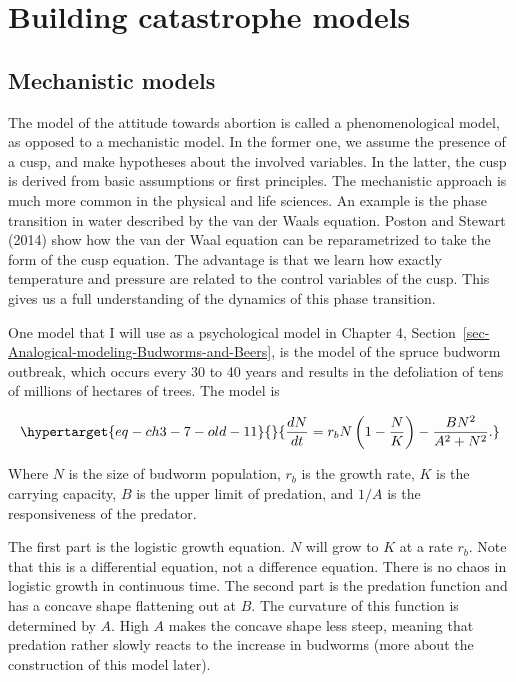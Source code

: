 \documentclass[
  a4paper,
  DIV=11,
  numbers=noendperiod,
  oneside]{scrreprt}
\begin{document}
\hypertarget{sec-Building-catastrophe-models}{%
\section{Building catastrophe
models}\label{sec-Building-catastrophe-models}}

\hypertarget{sec-Mechanistic-models}{%
\subsection{Mechanistic models}\label{sec-Mechanistic-models}}

The model of the attitude towards abortion is called a phenomenological
model, as opposed to a mechanistic model. In the former one, we assume
the presence of a cusp, and make hypotheses about the involved
variables. In the latter, the cusp is derived from basic assumptions or
first principles. The mechanistic approach is much more common in the
physical and life sciences. An example is the phase transition in water
described by the van der Waals equation. Poston and Stewart (2014) show
how the van der Waal equation can be reparametrized to take the form of
the cusp equation. The advantage is that we learn how exactly
temperature and pressure are related to the control variables of the
cusp. This gives us a full understanding of the dynamics of this phase
transition.

One model that I will use as a psychological model in Chapter 4,
Section~\ref{sec-Analogical-modeling-Budworms-and-Beers}, is the model
of the spruce budworm outbreak, which occurs every 30 to 40 years and
results in the defoliation of tens of millions of hectares of trees. The
model is

\begin{equation}\protect\hypertarget{eq-ch3-7-old-11}{}{
\frac{dN}{dt} = r_{b}N\left( 1 - \frac{N}{K} \right) - \frac{BN^{2}}{A^{2} + N^{2}}.
}\label{eq-ch3-7-old-11}\end{equation}

Where \(N\) is the size of budworm population, \(r_{b}\) is the growth
rate, \(K\) is the carrying capacity, \(B\) is the upper limit of
predation, and \(1/A\) is the responsiveness of the predator.

The first part is the logistic growth equation. \(N\) will grow to \(K\)
at a rate \(r_{b}\). Note that this is a differential equation, not a
difference equation. There is no chaos in logistic growth in continuous
time. The second part is the predation function and has a concave shape
flattening out at \(B\). The curvature of this function is determined by
\(A\). High \(A\) makes the concave shape less steep, meaning that
predation rather slowly reacts to the increase in budworms (more about
the construction of this model later).
\end{document}
